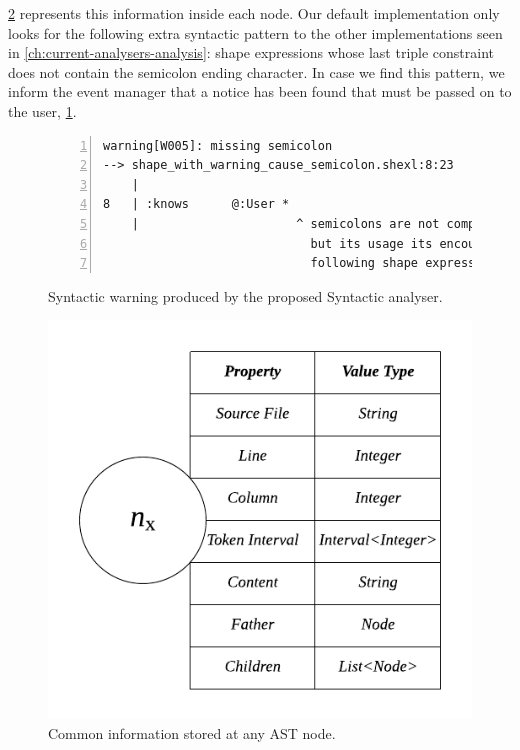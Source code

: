 \cref{fig:shex-lite-node-info} represents this information inside each node. Our default implementation only looks for the
following extra syntactic pattern to the other implementations seen in \cref{ch:current-analysers-analysis}: shape expressions whose last
triple constraint does not contain the semicolon ending character. In case we find this pattern, we inform the event manager
that a notice has been found that must be passed on to the user, \cref{fig:sin-err-example}.

\begin{figure}
    \begin{lstlisting}[numbers=left,basicstyle=\ttfamily\scriptsize]
warning[W005]: missing semicolon
--> shape_with_warning_cause_semicolon.shexl:8:23
    |
8   | :knows      @:User *
    |                      ^ semicolons are not compulsory in the last triple constraint,
                             but its usage its encouraged as otherwise your code wont be
                             following shape expressions specification.
    \end{lstlisting}
    \caption[Syntactic warning produced by the proposed Syntactic analyser]{Syntactic warning produced by the proposed Syntactic analyser.}
    \label{fig:sin-err-example}
\end{figure}

\begin{figure}
    \includegraphics[scale=0.7]{images/shex-lite-node-table.pdf}
    \centering
    \caption[Common information stored at any AST node]{Common information stored at any AST node.}
    \label{fig:shex-lite-node-info}
\end{figure}

